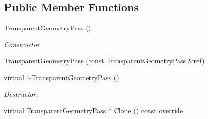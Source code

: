 \subsection*{Public Member Functions}
\begin{DoxyCompactItemize}
\item 
\mbox{\label{class_geometry_engine_1_1_geometry_render_step_1_1_transparent_geometry_pass_ab72551e63adc36d0a0462ed31c729e66}} 
\mbox{\hyperlink{class_geometry_engine_1_1_geometry_render_step_1_1_transparent_geometry_pass_ab72551e63adc36d0a0462ed31c729e66}{Transparent\+Geometry\+Pass}} ()
\begin{DoxyCompactList}\small\item\em Constructor. \end{DoxyCompactList}\item 
\mbox{\hyperlink{class_geometry_engine_1_1_geometry_render_step_1_1_transparent_geometry_pass_a345a08ae0ee85a990f56f8e943a4e22d}{Transparent\+Geometry\+Pass}} (const \mbox{\hyperlink{class_geometry_engine_1_1_geometry_render_step_1_1_transparent_geometry_pass}{Transparent\+Geometry\+Pass}} \&ref)
\item 
\mbox{\label{class_geometry_engine_1_1_geometry_render_step_1_1_transparent_geometry_pass_ae778f2628acf89a75613121eea32ec72}} 
virtual \mbox{\hyperlink{class_geometry_engine_1_1_geometry_render_step_1_1_transparent_geometry_pass_ae778f2628acf89a75613121eea32ec72}{$\sim$\+Transparent\+Geometry\+Pass}} ()
\begin{DoxyCompactList}\small\item\em Destructor. \end{DoxyCompactList}\item 
virtual \mbox{\hyperlink{class_geometry_engine_1_1_geometry_render_step_1_1_transparent_geometry_pass}{Transparent\+Geometry\+Pass}} $\ast$ \mbox{\hyperlink{class_geometry_engine_1_1_geometry_render_step_1_1_transparent_geometry_pass_a6bfc83f45b84112bbf1beda1ed8e5466}{Clone}} () const override
\end{DoxyCompactItemize}

